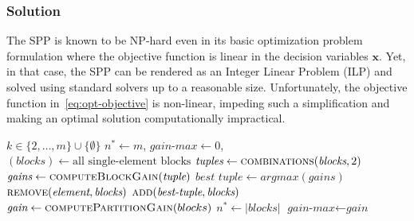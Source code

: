 \documentclass[journal]{IEEEtran}
\theoremstyle{plain} %
\newcommand{\eg}{\textit{e.g.},\xspace}
\newcommand{\mf}[1]{\textcolor{teal}{[Marco: #1]}}
\begin{document}
\vspace*{4pt}
\subsubsection{Solution}
The SPP is known to be NP-hard even in its basic optimization problem formulation where the objective function is linear in the decision variables $\pmb{x}$. Yet, in that case, the SPP can be rendered as an Integer Linear Problem (ILP) and solved using standard solvers up to a reasonable size.
Unfortunately, the objective function in~\eqref{eq:opt-objective} is non-linear, impeding such a simplification and making an optimal solution computationally impractical.


\begin{algorithm}[tb]
\caption{SPP greedy algorithm.}
\label{alg:greedy}
\begin{algorithmic}[1]
\small
\Require $k \in \{2, \dots, m\} \cup \{\emptyset\}$
\State $n^* \gets m$, $\textit{gain-max} \gets 0$, $(\textit{blocks}) \gets \text{all single-element blocks}$
 \label{alg:for-m}
    \State $\textit{tuples} \gets \Call {combinations}{\textit{blocks}, 2}$
     \label{alg:for-gains-begin}
        \State $\textit{gains} \gets \Call {computeBlockGain}{\textit{tuple}}$
    \EndFor \label{alg:for-gains-end}
    \State $\textit{best tuple} \gets argmax(\textit{gains})$ \label{alg:gain-max}
     \label{alg:for-update-begin}
                \State $\Call{remove}{\textit{element}, \textit{blocks}}$
            \EndIf
        \EndFor
    \EndFor
    \State $\Call{add}{\textit{best-tuple}, \textit{blocks}}$ \label{alg:for-update-end}
     \label{alg:store-max-begin}
        \State $\textit{gain} \gets \Call{computePartitionGain}{blocks}$
            \State $n^* \gets |\textit{blocks}|$
            \State $\textit{gain-max} \gets \textit{gain}$
        \EndIf
    \EndIf \label{alg:store-max-end}
\EndWhile
\end{algorithmic}
\end{algorithm}
\end{document}
